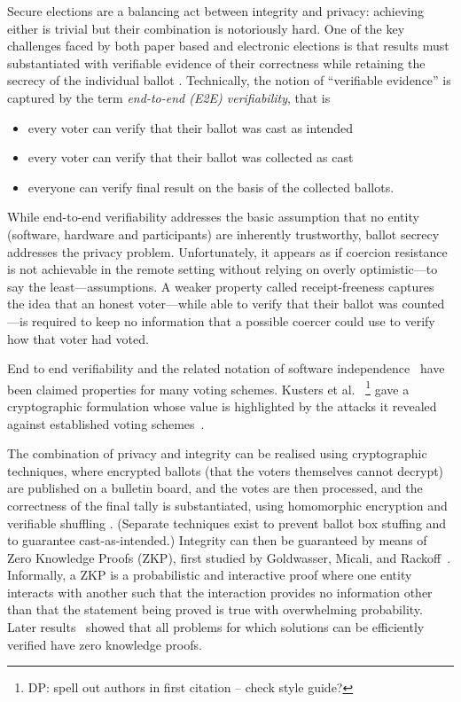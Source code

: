 \documentclass{llncs}
\begin{document}
Secure elections are a balancing act between integrity and privacy:
achieving either is trivial but their combination is notoriously hard.
One of the key challenges faced by both paper based and electronic
elections is that results must substantiated with
verifiable evidence of their correctness while retaining the secrecy
of the individual ballot \cite{Bernhard:2017:PES}.  Technically, the
notion of ``verifiable evidence'' is captured by the term 
\emph{end-to-end (E2E) verifiability}, that is
\begin{itemize}
  \item every voter can verify that their ballot was cast as
  intended
  \item every voter can verify that their ballot was collected as
  cast
  \item everyone can verify final result on the basis of the
  collected ballots.
\end{itemize}
While end-to-end verifiability addresses the basic assumption that
no entity (software, hardware and participants) are inherently
trustworthy, ballot secrecy addresses the privacy problem.
Unfortunately, it appears as if coercion resistance is not achievable  
in the remote setting without relying on overly optimistic---to say the least---assumptions.
A weaker property called receipt-freeness captures the idea that an honest 
voter---while able to verify that their ballot was counted---is required to keep 
no information that a possible coercer could use to verify how that voter had voted.

End to end verifiability and the related notation of software independence~\cite{Rivest:2008:PTRS}
 have been claimed properties for many voting schemes.  Kusters et
 al.~\cite{Kusters:2010:CCS} 
 \footnote{DP: spell out authors in first citation -- check style
 guide?}
 gave
 a cryptographic formulation whose value is highlighted by the attacks it revealed against established voting 
 schemes~\cite{Kusters:2012:SP}.

The combination of privacy and integrity can be realised using cryptographic techniques, where
encrypted ballots (that the voters themselves cannot decrypt) are
published on a bulletin board, and the votes are then processed, and
the correctness of the final tally is substantiated, using
homomorphic encryption \cite{Hirt:2000:ERF} and verifiable shuffling
\cite{Bayer:2012:EZK}. (Separate techniques exist to prevent ballot
box stuffing and to guarantee cast-as-intended.)
Integrity can then be guaranteed by means of Zero Knowledge Proofs
(ZKP),
first studied by Goldwasser, Micali, and Rackoff~\cite{Goldwasser:1985:STOC}.
Informally, a ZKP is a probabilistic and interactive proof where one
entity interacts with another such that the interaction provides
no information other than that the statement being proved is true with
overwhelming probability. 
Later results~\cite{Goldreich:1991:ACM,Ben-Or:1988:CRYPTO} showed that 
all problems for which solutions can be efficiently verified have zero knowledge
proofs.
\end{document}
